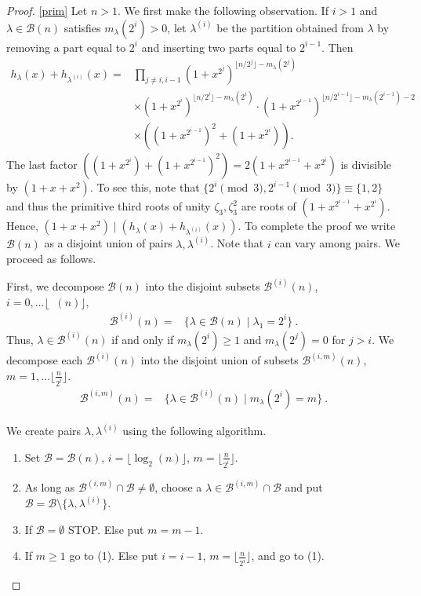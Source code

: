 \documentclass[reqno]{amsart}
\def\B{\mathcal{B}}
\DeclareMathOperator{\lb}{\log_2}
\theoremstyle{definition}
\begin{document}
\begin{proof}
\ref{prim} Let $n>1$.
We first make the following observation. If $i>1$ and $\lambda\in\mathcal B(n)$ satisfies  $m_\lambda(2^{i})>0$, let $\lambda^{(i)}$ be the partition obtained from $\lambda$ by removing a part equal to $2^i$ and inserting two parts equal to $2^{i-1}$. 
Then
\begin{align*}
h_\lambda(x)+h_{\lambda^{(i)}}(x)=&\prod_{j\neq i,i-1}(1+x^{2^j})^{\lfloor n/2^j\rfloor-m_\lambda(2^j)}\\
&\times(1+x^{2^i})^{\lfloor n/2^i\rfloor-m_\lambda(2^i)}\cdot(1+x^{2^{i-1}})^{\lfloor n/2^{i-1}\rfloor-m_\lambda(2^{i-1})-2}\\
&\times\left((1+x^{2^{i-1}})^2+(1+x^{2^i})\right).
\end{align*}
The last factor $\left((1+x^{2^i})+(1+x^{2^{i-1}})^2\right)=2(1+x^{2^{i-1}}+x^{2^i})$ is divisible by $(1+x+x^2)$. To see this, note that  $\{2^i \pmod 3, 2^{i-1}\pmod 3\}\equiv\{1,2\}$ and thus  the primitive third roots of unity $\zeta_3,\zeta_3^2$ are roots of $(1+x^{2^{i-1}}+x^{2^i})$. Hence, $(1+x+x^2)\mid (h_\lambda(x)+h_{\lambda^{(i)}}(x))$. To complete the proof we write $\mathcal B(n)$ as a disjoint union of pairs $\lambda, \lambda^{(i)}$. Note that $i$ can vary among pairs. We proceed as follows. 

First, we decompose $\mathcal B(n)$ into the disjoint subsets $\mathcal B^{(i)}(n)$, $i=0,\ldots \lfloor\lb(n)\rfloor,$ 
\begin{align*}
    \mathcal B^{(i)}(n)=&\{\lambda\in\mathcal B(n)\mid\lambda_1=2^i\}\:.
 \end{align*}
Thus, $\lambda\in \mathcal B^{(i)}(n)$ if and only if $m_\lambda(2^i)\geq 1$ and $m_\lambda(2^j)=0$ for $j>i$. We decompose each $\mathcal B^{(i)}(n)$ into the disjoint union of subsets $\mathcal B^{(i,m)}(n)$, $m=1, \ldots \lfloor \frac{n}{2^i}\rfloor$. \begin{align*}
    \mathcal B^{(i,m)}(n)=&\{\lambda\in\mathcal B^{(i)}(n)\mid m_\lambda(2^i)=m\}\:.
 \end{align*}


We create pairs $\lambda, \lambda^{(i)}$ using the following algorithm. 
\begin{enumerate}
    \item[(0)] Set $\mathcal B=\mathcal B(n)$, $i=\lfloor \log_2(n)\rfloor$, $m=\lfloor \frac{n}{2^i}\rfloor$. 
    \item[(1)]
    As long as $\mathcal B^{(i,m)}\cap \mathcal B\neq \emptyset$, choose a $\lambda\in \mathcal B^{(i,m)}\cap \mathcal B$ and put 
 $\mathcal B=\mathcal B\setminus \{\lambda, \lambda^{(i)}\}$. 
 \item[(2)] If $\B=\emptyset$ STOP.
Else put $m=m-1$.
\item[(3)] If $m\geq 1$ go to (1).
Else put $i=i-1$, $m=\lfloor\frac{n}{2^i}\rfloor$, and go to (1).
\end{enumerate}


\end{proof}
\end{document}
